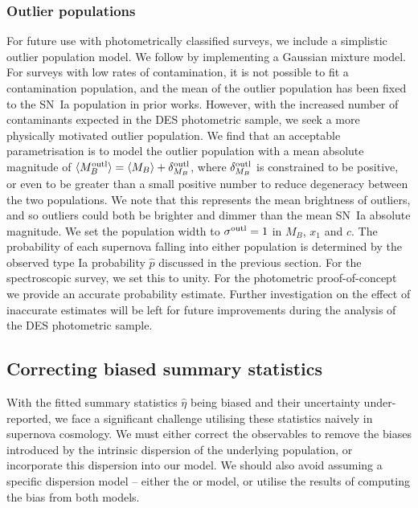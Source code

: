\documentclass[a4paper,fleqn,usenatbib,manuscript]{emulateapj}
\newcommand{\gten}{\citetalias{Guy2010}}
\newcommand{\celeven}{\citetalias{Chotard2011}}
\newcommand{\rubin}{\citetalias{Rubin2015}}
\begin{document}
\subsubsection{Outlier populations}

For future use with photometrically classified surveys, we include a simplistic outlier population model. We follow {\rubin} \citep[and therefore ][]{Kunz2007} by implementing a Gaussian mixture model. For surveys with low rates of contamination, it is not possible to fit a contamination population, and the mean of the outlier population has been fixed to the SN~Ia population in prior works. However, with the increased number of contaminants expected in the DES photometric sample, we seek a more physically motivated outlier population.  We find that an acceptable parametrisation is to model the outlier population with a mean absolute magnitude of $\langle M_B^{\rm outl} \rangle = \langle M_B \rangle + \delta_{M_B}^{\rm outl}$, where $\delta_{M_B}^{\rm outl}$ is constrained to be positive, or even to be greater than a small positive number to reduce degeneracy between the two populations.  We note that this represents the mean brightness of outliers, and so outliers could both be brighter and dimmer than the mean SN~Ia absolute magnitude. We set the population width to $\sigma^{\rm outl} = 1$ in $M_B$, $x_1$ and $c$. The probability of each supernova falling into either population is determined by the observed type Ia probability $\hat{p}$ discussed in the previous section. For the spectroscopic survey, we set this to unity. For the photometric proof-of-concept we provide an accurate probability estimate. Further investigation on the effect of inaccurate estimates will be left for future improvements during the analysis of the DES photometric sample.


\subsection{Correcting biased summary statistics}

With the fitted summary statistics $\hat{\eta}$ being biased and their uncertainty under-reported, we face a significant challenge utilising these statistics naively in supernova cosmology. We must either correct the observables to remove the biases introduced by the intrinsic dispersion of the underlying population, or incorporate this dispersion into our model. We should also avoid assuming a specific dispersion model -- either the {\gten} or {\celeven} model, or utilise the results of computing the bias from both models.
\end{document}
